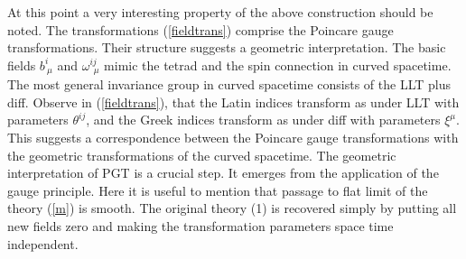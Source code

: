 \documentclass[12pt]{article}
\begin{document}
      At this point a very interesting property of the above construction should be noted. The transformations (\ref{fieldtrans}) comprise the Poincare gauge transformations. Their structure suggests a geometric interpretation. The basic fields $b^i_{\ \mu}$ and $\omega^{ij}_{\ \ \mu}$ mimic the tetrad and the spin connection in curved spacetime. The most general invariance group in curved spacetime consists of the LLT plus diff. Observe in (\ref{fieldtrans}), that the Latin indices transform as under LLT with parameters $\theta^{ij}$, and the Greek indices transform as under diff with parameters $\xi^\mu$. This suggests a correspondence between the Poincare gauge transformations with the geometric transformations of the curved spacetime. %
       The geometric interpretation of PGT is a crucial step. It emerges from the application of the gauge principle. Here it is useful to mention that passage to flat limit of the theory (\ref{m}) is smooth. The original theory (1) is recovered simply by putting all new fields zero and making the transformation parameters space time independent.

\end{document}
